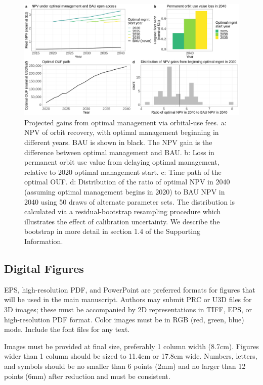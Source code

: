 \documentclass[9pt,twocolumn,twoside,lineno]{pnas-new}
\begin{document}
\begin{figure}%
	\centering
	\includegraphics[width=.8\linewidth]{main_text_figure_2.png}
	\caption{Projected gains from optimal management via orbital-use fees. a: NPV of orbit recovery, with optimal management beginning in different years. BAU is shown in black. The NPV gain is the difference between optimal management and BAU. b: Loss in permanent orbit use value from delaying optimal management, relative to 2020 optimal management start. c: Time path of the optimal OUF. d: Distribution of the ratio of optimal NPV in 2040 (assuming optimal management begins in 2020) to BAU NPV in 2040 using 50 draws of alternate parameter sets. The distribution is calculated via a residual-bootstrap resampling procedure which illustrates the effect of calibration uncertainty. We describe the bootstrap in more detail in section 1.4 of the Supporting Information.}
	\label{fig:MT2}
\end{figure}


\subsection*{Digital Figures}

EPS, high-resolution PDF, and PowerPoint are preferred formats for figures that will be used in the main manuscript. Authors may submit PRC or U3D files for 3D images; these must be accompanied by 2D representations in TIFF, EPS, or high-resolution PDF format. Color images must be in RGB (red, green, blue) mode. Include the font files for any text.

Images must be provided at final size, preferably 1 column width (8.7cm). Figures wider than 1 column should be sized to 11.4cm or 17.8cm wide. Numbers, letters, and symbols should be no smaller than 6 points (2mm) and no larger than 12 points (6mm) after reduction and must be consistent. 
\end{document}

